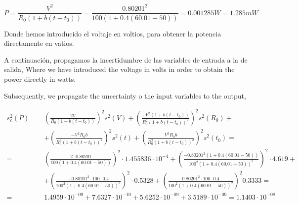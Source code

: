 \begin{equation*}
P = \frac{V^2}{R_0\left(1+b(t-t_0)\right)}=\frac{0.80201^2}{100\left(1+0.4(60.01-50)\right)} =  0.001285 W = 1.285 mW
\end{equation*}

\begin{paracol}{2}

Donde hemos introducido el voltaje en voltios, para  obtener la potencia directamente en vatios.

A continuación, propagamos la incertidumbre de las variables de entrada a la de salida,
\switchcolumn
Where we have introduced the voltage in volts in order to obtain the power directly in watts.

Subsequently, we propagate the uncertainty o the input variables to the output, 
\end{paracol}
\begin{align*}
s_c^2(P) =& \left(\frac{2V}{R_0\left(1+b(t-t_0)\right)}\right)^2 s^2(V)+ \left(\frac{-V^2\left(1+b(t-t_0)\right)}{R_0^2\left(1+b(t-t_0)\right)^2}\right)^2 s^2(R_0)+\\
&+ \left(\frac{-V^2R_0b}{R_0^2\left(1+b(t-t_0)\right)^2}\right)^2 s^2(t)+\left(\frac{V^2R_0b}{R_0^2\left(1+b(t-t_0)\right)^2}\right)^2 s^2(t_0)=\\
=& \left(\frac{2 \cdot 0.80201}{100\left(1+0.4(60.01-50)\right)}\right)^2 \cdot 1.455836\cdot10^{-4} + \left(\frac{- 0.80201^2\left(1+0.4(60.01-50)\right)}{100^2\left(1+0.4(60.01-50)\right)^2}\right)^2 \cdot 4.619+\\
&+ \left(\frac{- 0.80201^2\cdot100\cdot0.4}{100^2\left(1+0.4(60.01-50)\right)^2}\right)^2\cdot 0.5328 +\left(\frac{0.80201^2\cdot100\cdot0.4}{100^2\left(1+0.4(60.01-50)\right)^2}\right)^2 0.3333=\\
=&1.4959\cdot10^{-09} + 7.6327\cdot10^{-10} + 5.6252\cdot10^{-09} + 3.5189\cdot10^{-09} =  1.1403\cdot 10^{-08}
\end{align*} 


